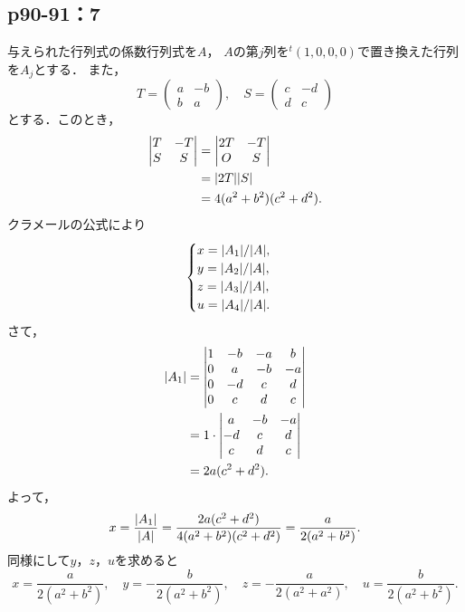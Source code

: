 \documentclass[uplatex,dvipdfmx,a4paper,11pt,fleqn]{jsarticle}
\begin{document}
\newpage 

\subsection*{p90-91：7}


\begin{tleftbar}
    与えられた行列式の係数行列式を$A$， $A$の第$j$列を${}^t (1, 0, 0 ,0 )$で置き換えた行列を$A_j$とする．
    また，
    \[
    T = \begin{pmatrix} a & -b\\ b & a \end{pmatrix},\quad S = \begin{pmatrix} c & -d\\ d & c \end{pmatrix}
    \]
    とする．このとき，
    \begin{align*} 
        \begin{vmatrix} T & -T \\  S & S \end{vmatrix}& = \begin{vmatrix} 2T & - T \\ O & S \end{vmatrix} \\
            & = \abs{2T} \abs{S} \\
            & = 4(a^2+b^2) (c^2+d^2).
        \end{align*} 
        クラメールの公式により
        \[
            \begin{cases}
            x  = \abs{A_1}/\abs{A}, \\
            y = \abs{A_2}/\abs{A},\\
            z = \abs{A_3}/\abs{A}, \\
            u = \abs{A_4}/\abs{A}.
            \end{cases}
        \]
        さて，
        \begin{align*} 
            \abs{A_1} & = \begin{vmatrix} 1 & -b & -a & b \\ 0 & a & -b & -a \\ 0 & -d & c & d \\ 0 & c & d & c \end{vmatrix} \\
            & = 1 \cdot \begin{vmatrix} a & -b & -a \\ -d & c & d \\ c & d & c \end{vmatrix} \\
            & = 2a(c^2+d^2).
        \end{align*}
        よって，
        \[
        x = \frac{\abs{A_1}}{\abs{A}} = \frac{2a(c^2+d^2)}{4(a^2+b^2)(c^2+d^2)} = \frac{a}{2(a^2+b^2)}.
        \]
        同様にして$y$，$z$，$u$を求めると
        \[
        x= \frac{a}{2(a^2+b^2)},\quad y = -\frac{b}{2(a^2+b^2)},\quad z = -\frac{a}{2(a^2+a^2)},\quad u = \frac{b}{2(a^2+b^2)}.
        \]
    \end{tleftbar}
\end{document}
